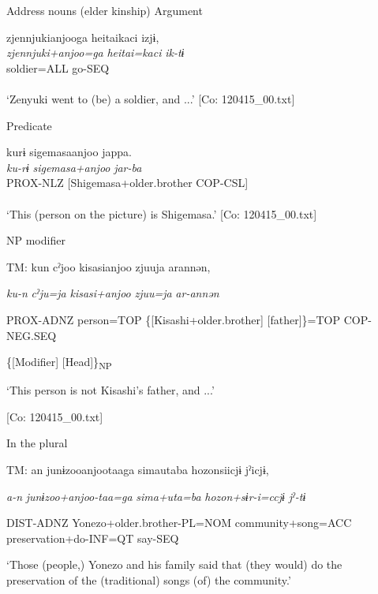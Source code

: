 \ea \label{ex:7:6}  Address nouns (elder kinship)
\ea \label{ex:7:6a}Argument

\gllll  zjennjukianjooga  {\textbar}heitai{\textbar}kaci  izjɨ,\\
\textit{zjennjuki+anjoo=ga}  \textit{heitai=kaci}  \textit{ik-tɨ}\\
[Zenyuki+older.brother=NOM]  soldier=ALL  go-SEQ\\
[Subject]    \\
\glt ‘Zenyuki went to (be) a soldier, and ...’ [Co: 120415\_00.txt]

\ex \label{ex:7:6b}Predicate

\gllll  kurɨ  sigemasaanjoo  jappa.\\
\textit{ku-rɨ}  \textit{sigemasa+anjoo}  \textit{jar-ba}\\
PROX-NLZ  [Shigemasa+older.brother  COP-CSL]\\
[Nominal predicate]  \\
\glt ‘This (person on the picture) is Shigemasa.’ [Co: 120415\_00.txt]

\ex \label{ex:7:6c}NP modifier

    TM:  kun  cˀjoo  kisasianjoo  zjuuja  arannən,

      \textit{ku-n}  \textit{cˀju=ja}  \textit{kisasi+anjoo}  \textit{zjuu=ja} \textit{ar-annən}
                                                                              
      PROX-ADNZ  person=TOP  \{[Kisashi+older.brother]  [father]\}=TOP         COP-NEG.SEQ

          \{[Modifier]  [Head]\}\textsubscript{NP}

      ‘This person is not Kisashi’s father, and ...’

      [Co: 120415\_00.txt]

\ex \label{ex:7:6d}In the plural

    TM:  an  junɨzooanjootaaga  simautaba hozonsiicjɨ  jˀicjɨ,

      \textit{a-n}  \textit{junɨzoo+anjoo-taa=ga}  \textit{sima+uta=ba}  \textit{hozon+sɨr-i=ccjɨ}  \textit{jˀ-tɨ}
                                                                        
      DIST-ADNZ  Yonezo+older.brother-PL=NOM  community+song=ACC         preservation+do-INF=QT  say-SEQ

      ‘Those (people,) Yonezo and his family said that (they would) do the preservation of the (traditional) songs (of) the community.’

